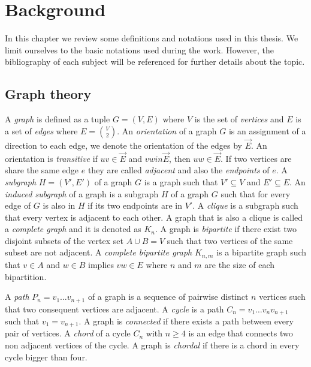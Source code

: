 \chapter{Background}
\label{chap:background}

In this chapter we review some definitions and notations used in this thesis. We limit ourselves to the basic notations used during the work. However, the bibliography of each subject will be referenced for further details about the topic.


%
%
%

\section{Graph theory}

A \emph{graph} is defined as a tuple $G = (V,E)$ where $V$ is the set of \emph{vertices} and $E$ is a set of \emph{edges} where $E = \binom{V}{2}$. An \emph{orientation} of a graph $G$ is an assignment of a direction to each edge, we denote the orientation of the edges by $\overrightarrow{E}$. An orientation is \emph{transitive} if $uv \in \overrightarrow{E}$ and $vw in \overrightarrow{E}$, then $uw \in \overrightarrow{E}$. If two vertices are share the same edge $e$ they are called \emph{adjacent} and also the \emph{endpoints} of $e$. A \emph{subgraph} $H = (V', E')$ of a graph $G$ is a graph such that $V' \subseteq V$ and $E' \subseteq E$. An \emph{induced subgraph} of a graph is a subgraph $H$ of a graph $G$ such that for every edge of $G$ is also in $H$ if its two endpoints are in $V'$. A \emph{clique} is a subgraph such that every vertex is adjacent to each other. A graph that is also a clique is called a \emph{complete graph} and it is denoted as $K_n$. A graph is \emph{bipartite} if there exist two disjoint subsets of the vertex set $A \cup B = V$ such that two vertices of the same subset are not adjacent. A \emph{complete bipartite graph} $K_{n,m}$ is a bipartite graph such that $v \in A$ and $w \in B$ implies $vw \in E$ where $n$ and $m$ are the size of each bipartition.

A \emph{path} $P_n = v_1\dots v_{n+1}$ of a graph is a sequence of pairwise distinct $n$ vertices such that two consequent vertices are adjacent. A \emph{cycle} is a path $C_n = v_1\dots v_nv_{n+1}$ such that $v_1=v_{n+1}$. A graph is \emph{connected} if there exists a path between every pair of vertices. A \emph{chord} of a cycle $C_n$ with $n \geqslant 4$ is an edge that connects two non adjacent vertices of the cycle. A graph is \emph{chordal} if there is a chord in every cycle bigger than four.

